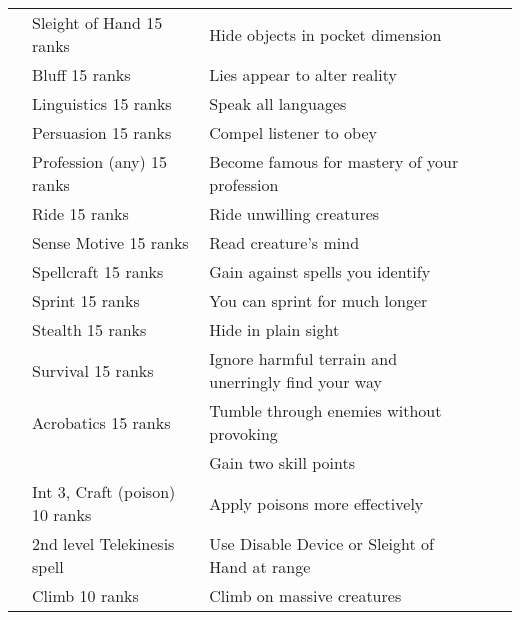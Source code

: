 \begin{longtabuwrapper}
\begin{longtabu}{>{\lcol}p{10em} >{\lcol}p{15em} >{\lcol}X >{\lcol}p{8em} >{\lcol}p{3em}}
         & Sleight of Hand 15 ranks & Hide objects in pocket dimension & \x &  \\
         & Bluff 15 ranks & Lies appear to alter reality & \x &  \\
         & Linguistics 15 ranks & Speak all languages & \x &  \\
         & Persuasion 15 ranks & Compel listener to obey & \x &  \\
         & Profession (any) 15 ranks & Become famous for mastery of your profession & \x &  \\
         & Ride 15 ranks & Ride unwilling creatures & \x &  \\
         & Sense Motive 15 ranks & Read creature's mind & \x &  \\
         & Spellcraft 15 ranks & Gain  against spells you identify & \x &  \\
         & Sprint 15 ranks & You can sprint for much longer & \x &  \\
         & Stealth 15 ranks & Hide in plain sight & \x &  \\
         & Survival 15 ranks & Ignore harmful terrain and unerringly find your way & \x &  \\
         & Acrobatics 15 ranks & Tumble through enemies without provoking & \x &  \\
         & \x & Gain two skill points & \x &  \\
         & Int 3, Craft (poison) 10 ranks & Apply poisons more effectively & \x &  \\
         &  2nd level Telekinesis spell & Use Disable Device or Sleight of Hand at range & \x &  \\
         & Climb 10 ranks & Climb on massive creatures & \x &  \\

\end{longtabu}
\end{longtabuwrapper}
